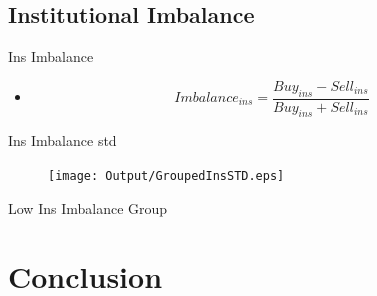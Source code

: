 \documentclass{beamer}
\begin{document}
\subsection{Institutional Imbalance}
\begin{frame}{Ins Imbalance}

\begin{itemize}
	\item \cite{seasholes2007predictable}
	
		\begin{equation*}
			Imbalance_{ins} = \frac{Buy_{ins} - Sell_{ins}}{Buy_{ins} + Sell_{ins}}
		\end{equation*}
	\begin{table}[htbp]
		\centering
		\resizebox{0.8\textwidth}{!}{
			
		}
		\label{tab:ImbalanceInsMeanSummary}
	\end{table}
		
	
	
\end{itemize}

\end{frame}


\begin{frame}{Ins Imbalance std}
	\begin{table}[htbp]
		\centering
		\resizebox{0.85\textwidth}{!}{
			
		}
		\label{tab:ImbalanceInsStdSummary}
	\end{table}



\begin{figure}[htbp]
	\centering
	\texttt{[image: Output/GroupedInsSTD.eps]}
	\label{fig:GroupedInsSTD}
\end{figure}
\end{frame}
\begin{frame}{Low Ins Imbalance Group}


				\begin{table}[htbp]
			\centering
			\resizebox{0.8\textwidth}{!}{
				
			}
		\end{table}
	
	\end{frame}

	
	\section{Conclusion}
	
\end{document}
